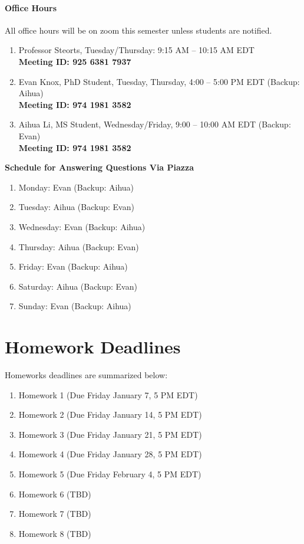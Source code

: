 \documentclass[11pt]{article}
\begin{document}
\paragraph{Office Hours}
All office hours will be on zoom this semester unless students are notified.
\begin{enumerate}
\item Professor Steorts, Tuesday/Thursday: 9:15 AM -- 10:15 AM EDT \\
\textbf{Meeting ID: 925 6381 7937}
\item Evan Knox, PhD Student, Tuesday, Thursday, 4:00 -- 5:00 PM EDT (Backup: Aihua)\\
\textbf{Meeting ID: 974 1981 3582} 
\item Aihua Li, MS Student, Wednesday/Friday, 9:00 -- 10:00 AM EDT  (Backup: Evan)\\
\textbf{Meeting ID: 974 1981 3582}
\end{enumerate}


\textbf{Schedule for Answering Questions Via Piazza}
\begin{enumerate}
\item Monday: Evan (Backup: Aihua)
\item Tuesday: Aihua (Backup: Evan)
\item Wednesday: Evan (Backup: Aihua)
\item Thursday: Aihua (Backup: Evan)
\item Friday: Evan (Backup: Aihua)
\item Saturday: Aihua (Backup: Evan)
\item Sunday: Evan (Backup: Aihua)
\end{enumerate}



\section{Homework Deadlines}
Homeworks deadlines are summarized below:

\begin{enumerate}
\item Homework 1 (Due Friday January 7, 5 PM EDT)
\item Homework 2 (Due Friday January 14, 5 PM EDT)
\item Homework 3 (Due Friday January 21, 5 PM EDT)
\item Homework 4 (Due Friday January 28, 5 PM EDT)
\item Homework 5 (Due Friday February 4, 5 PM EDT)
\item Homework 6 (TBD)
\item Homework 7 (TBD)
\item Homework 8 (TBD)
\end{enumerate} 
\end{document}
